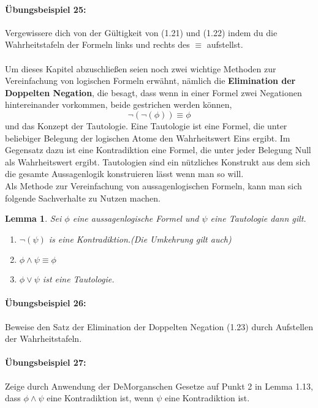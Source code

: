 \documentclass[11pt,a4paper,leqno]{report}
\newtheorem{lemma}[theorem]{Lemma}
\numberwithin{equation}{chapter}
\begin{document}
\paragraph{Übungsbeispiel 25:} Vergewissere dich von der Gültigkeit von (1.21) und (1.22) indem du die Wahrheitstafeln der Formeln links und rechts des $\equiv$ aufstellst.\\
\\
Um dieses Kapitel abzuschließen seien noch zwei wichtige Methoden zur Vereinfachung von logischen Formeln erwähnt, nämlich die \textbf{Elimination der Doppelten Negation}, die besagt, dass wenn in einer Formel zwei Negationen hintereinander vorkommen, beide gestrichen werden können,
\begin{equation}
\neg(\neg(\phi))\equiv\phi
\end{equation}
und das Konzept der Tautologie. Eine Tautologie ist eine Formel, die unter beliebiger Belegung der logischen Atome den Wahrheitswert Eins ergibt. 
Im Gegensatz dazu ist eine Kontradiktion eine Formel, die unter jeder Belegung Null als Wahrheitswert ergibt. Tautologien sind ein nützliches Konstrukt aus dem sich die gesamte Aussagenlogik konstruieren lässt wenn man so will.\\
Als Methode zur Vereinfachung von aussagenlogischen Formeln, kann man sich folgende Sachverhalte zu Nutzen machen.
\begin{lemma}
	Sei $\phi$ eine aussagenlogische Formel und $\psi$ eine Tautologie dann gilt.
	\begin{enumerate}
		\item $\neg(\psi)$ is eine Kontradiktion.(Die Umkehrung gilt auch)
		\item $\phi\wedge\psi\equiv\phi$
		\item $\phi\vee\psi$ ist eine Tautologie.
	\end{enumerate}
\end{lemma}

\paragraph{Übungsbeispiel 26:} Beweise den Satz der Elimination der Doppelten Negation (1.23) durch Aufstellen der Wahrheitstafeln.
\paragraph{Übungsbeispiel 27:} Zeige durch Anwendung der DeMorganschen Gesetze auf Punkt 2 in Lemma 1.13, dass $\phi\wedge\psi$ eine Kontradiktion ist, wenn $\psi$ eine Kontradiktion ist.
\end{document}
